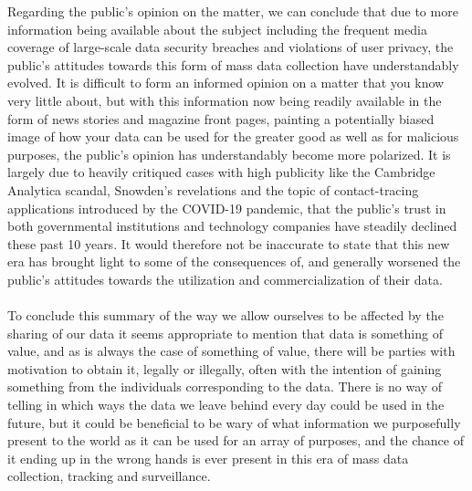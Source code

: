 \documentclass[11pt]{article}
\begin{document}
Regarding the public’s opinion on the matter, we can conclude that due to more information being available about the subject including the frequent media coverage of large-scale data security breaches and violations of user privacy, the public’s attitudes towards this form of mass data collection have understandably evolved. It is difficult to form an informed opinion on a matter that you know very little about, but with this information now being readily available in the form of news stories and magazine front pages, painting a potentially biased image of how your data can be used for the greater good as well as for malicious purposes, the public’s opinion has understandably become more polarized. It is largely due to heavily critiqued cases with high publicity like the Cambridge Analytica scandal, Snowden’s revelations and the topic of contact-tracing applications introduced by the COVID-19 pandemic, that the public’s trust in both governmental institutions and technology companies have steadily declined these past 10 years. It would therefore not be inaccurate to state that this new era has brought light to some of the consequences of, and generally worsened the public’s attitudes towards the utilization and commercialization of their data.
\\ \\
To conclude this summary of the way we allow ourselves to be affected by the sharing of our data it seems appropriate to mention that data is something of value, and as is always the case of something of value, there will be parties with motivation to obtain it, legally or illegally, often with the intention of gaining something from the individuals corresponding to the data. There is no way of telling in which ways the data we leave behind every day could be used in the future, but it could be beneficial to be wary of what information we purposefully present to the world as it can be used for an array of purposes, and the chance of it ending up in the wrong hands is ever present in this era of mass data collection, tracking and surveillance.
\\
\end{document}
